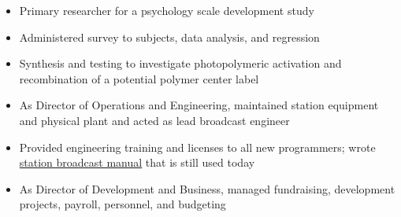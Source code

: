 \documentclass[10pt,a4paper]{altacv}
\begin{document}
\divider

\begin{itemize}
\item Primary researcher for a psychology scale development study
\item Administered survey to subjects, data analysis, and regression
\end{itemize}

\divider

\begin{itemize}
\item Synthesis and testing to investigate photopolymeric activation and recombination of a potential polymer center label
\end{itemize}

\divider

\begin{itemize}
\item As Director of Operations and Engineering, maintained station equipment and physical plant and acted as lead broadcast engineer
\item Provided engineering training and licenses to all new programmers; wrote 
\href{https://www.cc-seas.columbia.edu/wkcr/bluebook.html}{station broadcast manual} that is still used today
\item As Director of Development and Business, managed fundraising, development projects, payroll, personnel, and budgeting
\end{itemize}

\end{document}
